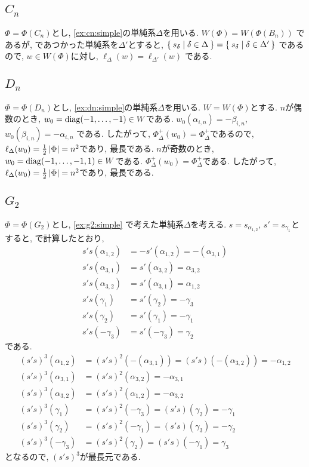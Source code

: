 \subsection{$C_{n}$}
$\Phi=\Phi(C_n)$とし,
\cref{ex:cn:simple}の単純系$\Delta$を用いる.
$W(\Phi)=W(\Phi(B_n))$
であるが,
であつかった単純系を$\Delta'$とすると,
$\Set{s_\delta|\delta\in \Delta}=\Set{s_\delta|\delta\in \Delta'}$
であるので,
$w\in W(\Phi)$に対し,
$\ell_\Delta(w)=\ell_{\Delta'}(w)$
である.

\subsection{$D_{n}$}
$\Phi=\Phi(D_n)$とし,
\cref{ex:dn:simple}の単純系$\Delta$を用いる.
$W=W(\Phi)$とする.
$n$が偶数のとき,
$w_0=\operatorname{diag}(-1,\ldots,-1)\in W$である.
$w_0(\alpha_{i,n})=-\beta_{i,n}$,
$w_0(\beta_{i,n})=-\alpha_{i,n}$
である.
したがって, $\Phi_\Delta^+(w_0)=\Phi_\Delta^+$であるので,
$\ell_\Delta(w_0)=\frac{1}{2}\left|\Phi\right|=n^2$であり,
最長である.
$n$が奇数のとき,
$w_0=\operatorname{diag}(-1,\ldots,-1,1)\in W$である.
$\Phi_\Delta^+(w_0)=\Phi_\Delta^+$である.
したがって, $\ell_\Delta(w_0)=\frac{1}{2}\left|\Phi\right|=n^2$であり,
最長である.

\subsection{$G_2$}
$\Phi=\Phi(G_2)$とし,
\cref{ex:g2:simple}
で考えた単純系$\Delta$を考える.
$s=s_{\alpha_{1,2}}$, $s'=s_{\gamma_{1}}$とすると,
で計算したとおり,
\begin{align*}
s's(\alpha_{1,2})&=-s'(\alpha_{1,2})=-(\alpha_{3,1})\\
s's(\alpha_{3,1})&=s'(\alpha_{3,2})=\alpha_{3,2}\\
s's(\alpha_{3,2})&=s'(\alpha_{3,1})=\alpha_{1,2}\\
s's(\gamma_1)&=s'(\gamma_{2})=-\gamma_{3}\\
s's(\gamma_2)&=s'(\gamma_{1})=-\gamma_1\\
s's(-\gamma_3)&=s'(-\gamma_{3})=\gamma_2
\end{align*}
である.
\begin{align*}
(s's)^3(\alpha_{1,2})&=(s's)^2(-(\alpha_{3,1}))=(s's)(-(\alpha_{3,2}))=-\alpha_{1,2}\\
(s's)^3(\alpha_{3,1})&=(s's)^2(\alpha_{3,2})=-\alpha_{3,1}\\
(s's)^3(\alpha_{3,2})&=(s's)^2(\alpha_{1,2})=-\alpha_{3,2}\\
(s's)^3(\gamma_1)&=(s's)^2(-\gamma_{3})=(s's)(\gamma_{2})=-\gamma_{1}\\
(s's)^3(\gamma_2)&=(s's)^2(-\gamma_1)=(s's)(\gamma_{3})=-\gamma_{2}\\
(s's)^3(-\gamma_3)&=(s's)^2(\gamma_2)=(s's)(-\gamma_{1})=\gamma_{3}
\end{align*}
となるので,
$(s's)^3$が最長元である.


